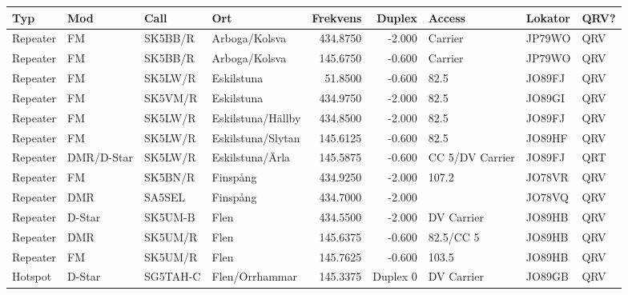 {\begin{landscape}
\begin{longtable}{llllrrlll}
	\bf Typ           & \bf Mod    & \bf Call & \bf Ort              & \bf Frekvens & \bf Duplex & \bf Access        & \bf Lokator & \bf QRV? \\ \hline
	\endhead
Repeater & FM         & SK5BB/R  & Arboga/Kolsva        &     434.8750 &     -2.000 & Carrier           & JP79WO      & QRV      \\
	Repeater          & FM         & SK5BB/R  & Arboga/Kolsva        &     145.6750 &     -0.600 & Carrier           & JP79WO      & QRV      \\
	Repeater          & FM         & SK5LW/R  & Eskilstuna           &      51.8500 &     -0.600 & 82.5              & JO89FJ      & QRV      \\
	Repeater          & FM         & SK5VM/R  & Eskilstuna           &     434.9750 &     -2.000 & 82.5              & JO89GI      & QRV      \\
	Repeater          & FM         & SK5LW/R  & Eskilstuna/Hällby    &     434.8500 &     -2.000 & 82.5              & JO89FJ      & QRV      \\
	Repeater          & FM         & SK5LW/R  & Eskilstuna/Slytan    &     145.6125 &     -0.600 & 82.5              & JO89HF      & QRV      \\
	Repeater          & DMR/D-Star & SK5LW/R  & Eskilstuna/Ärla      &     145.5875 &     -0.600 & CC 5/DV Carrier   & JO89FJ      & QRT      \\
	Repeater          & FM         & SK5BN/R  & Finspång             &     434.9250 &     -2.000 & 107.2             & JO78VR      & QRV      \\
	Repeater          & DMR        & SA5SEL   & Finspång             &     434.7000 &     -2.000 &                   & JO78VQ      & QRV      \\
	Repeater          & D-Star     & SK5UM-B  & Flen                 &     434.5500 &     -2.000 & DV Carrier        & JO89HB      & QRV      \\
	Repeater          & DMR        & SK5UM/R  & Flen                 &     145.6375 &     -0.600 & 82.5/CC 5         & JO89HB      & QRV      \\
	Repeater          & FM         & SK5UM/R  & Flen                 &     145.7625 &     -0.600 & 103.5             & JO89HB      & QRV      \\
	Hotspot           & D-Star     & SG5TAH-C & Flen/Orrhammar       &     145.3375 &   Duplex 0 & DV Carrier        & JO89GB      & QRV      \\

\end{longtable}
\end{landscape}}
